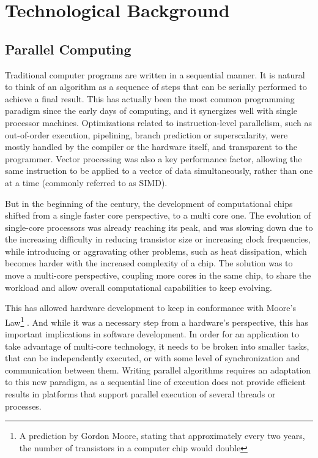 \documentclass[main.tex]{subfiles}
\begin{document}
\chapter{Technological Background} \label{section:back}


\section{Parallel Computing}

Traditional computer programs are written in a sequential manner. It is natural to think of an algorithm as a sequence of steps that can be serially performed to achieve a final result. This has actually been the most common programming paradigm since the early days of computing, and it synergizes well with single processor machines. Optimizations related to instruction-level parallelism, such as out-of-order execution, pipelining, branch prediction or superscalarity, were mostly handled by the compiler or the hardware itself, and transparent to the programmer. Vector processing was also a key performance factor, allowing the same instruction to be applied to a vector of data simultaneously, rather than one at a time (commonly referred to as \ac{SIMD}).

But in the beginning of the  century, the development of computational chips shifted from a single faster core perspective, to a multi core one. The evolution of single-core processors was already reaching its peak, and was slowing down due to the increasing difficulty in reducing transistor size or increasing clock frequencies, while introducing or aggravating other problems, such as heat dissipation, which becomes harder with the increased complexity of a chip. The solution was to move a multi-core perspective, coupling more cores in the same chip, to share the workload and allow overall computational capabilities to keep evolving.

This has allowed hardware development to keep in conformance with Moore's Law\footnote{A prediction by Gordon Moore, stating that approximately every two years, the number of transistors in a computer chip would double} \cite{schaller1997moore}. And while it was a necessary step from a hardware's perspective, this has important implications in software development. In order for an application to take advantage of multi-core technology, it needs to be broken into smaller tasks, that can be independently executed, or with some level of synchronization and communication between them. Writing parallel algorithms requires an adaptation to this new paradigm, as a sequential line of execution does not provide efficient results in platforms that support parallel execution of several threads or processes.
\end{document}
